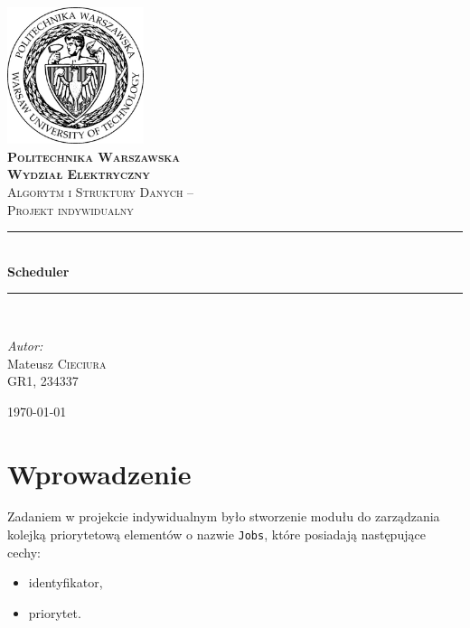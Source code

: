 \documentclass[12pt,a4paper]{article}
\newcommand{\HRule}{\rule{\linewidth}{0.5mm}}
\begin{document}
\begin{titlepage}

  \begin{center}
    \includegraphics[width=0.3\textwidth]{img/logo.jpg}\\[1cm]
    
    \textsc{\LARGE \textbf{Politechnika Warszawska \\ Wydział Elektryczny}}\\[1.5cm]
    
    \large \textsc{Algorytm i Struktury Danych -- \\ Projekt indywidualny}\\[0.5cm]

    \HRule \\[0.4cm]
    {\huge \bfseries Scheduler }\\[0.2cm]
    \HRule \\[1.5cm]
   
		\begin{flushleft}
		\textit{Autor:} \\
    {\large
    Mateusz \textsc{Cieciura} \\ GR1, 234337}
		\end{flushleft}
    
    \vfill

    {\large \today}
  \end{center}

\end{titlepage}

\tableofcontents

\section{Wprowadzenie}

Zadaniem w projekcie indywidualnym było stworzenie modułu do zarządzania kolejką priorytetową elementów o nazwie \texttt{Jobs}, które posiadają następujące cechy:

\begin{itemize}
	\item identyfikator,
	\item priorytet.
\end{itemize}
\end{document}
